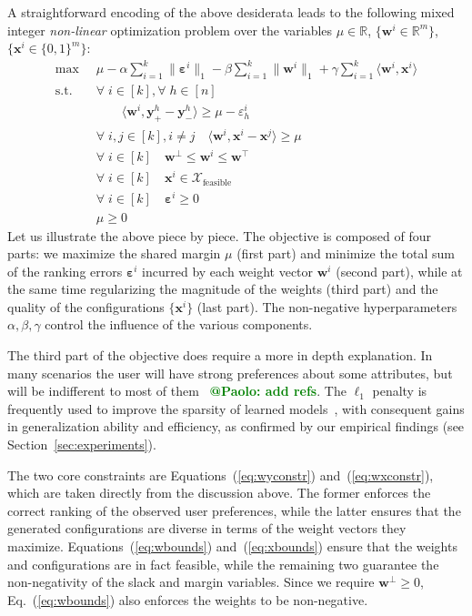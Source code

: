 \documentclass{article}
\renewcommand\[{\begin{equation}}
\renewcommand\]{\end{equation}}
\newcommand{\bbR}{\mathbb{R}}
\newcommand{\calvar}[1]{\ensuremath{\mathcal{#1}}}
\newcommand{\calX}{\calvar{X}}
\newcommand{\vecvar}[1]{\ensuremath{\boldsymbol{#1}}}
\newcommand{\vw}{\vecvar{w}}
\newcommand{\vx}{\vecvar{x}}
\newcommand{\vy}{\vecvar{y}}
\newcommand{\veps}{\vecvar{\varepsilon}}
\newcommand{\stefano}[1]{{\bf \textcolor{green}{{\fbox{Stefano:} #1}}}}
\begin{document}
A straightforward encoding of the above desiderata leads to the
following mixed integer {\em non-linear} optimization problem over the
variables $\mu \in \bbR$, $\{ \vw^i \in \bbR^m \}$, $\{ \vx^i \in \{0,1\}^m \}$:
%
{\footnotesize
\begin{align}
    \max
        & \;\; \mu - \alpha \sum_{i=1}^k \| \veps^{i} \|_1 - \beta \sum_{i=1}^k \| \vw^{i} \|_1 + \gamma \sum_{i=1}^k \langle \vw^{i}, \vx^{i} \rangle
        \nonumber
    \\
    \text{s.t.}
        & \;\; \forall \; i \in [k], \forall \; h \in [n] \nonumber
    \\
        & \;\; \qquad \langle \vw^{i}, \vy^{h}_+ - \vy^{h}_- \rangle \ge \mu - \varepsilon^{i}_h \label{eq:wyconstr}
    \\
        & \;\; \forall \; i, j \in [k], i \neq j \quad \langle \vw^{i}, \vx^{i} - \vx^{j} \rangle \ge \mu \label{eq:wxconstr}
    \\
        & \;\; \forall \; i \in [k] \quad \vw^\bot \le \vw^{i} \le \vw^\top \label{eq:wbounds}
    \\
        & \;\; \forall \; i \in [k] \quad \vx^{i} \in \calX_{\text{feasible}} \label{eq:xbounds}
    \\
        & \;\; \forall \; i \in [k] \quad \veps^{i} \ge 0 \nonumber
    \\
        & \;\; \mu \ge 0 \nonumber
\end{align}
}
%
Let us illustrate the above piece by piece. The objective is composed of four
parts: we maximize the shared margin $\mu$ (first part) and minimize the total
sum of the ranking errors $\veps^i$ incurred by each weight vector $\vw^{i}$
(second part), while at the same time regularizing the magnitude of the
weights (third part) and the quality of the configurations $\{ \vx^{i} \}$ (last
part). The non-negative hyperparameters $\alpha,\beta,\gamma$ control the
influence of the various components.

The third part of the objective does require a more in depth explanation. In
many scenarios the user will have strong preferences about some attributes, but
will be indifferent to most of them~\cite{} \stefano{@Paolo: add refs}. The $\ell_1$ penalty is frequently
used to improve the sparsity of learned models~\cite{lasso}, with consequent gains
in generalization ability and efficiency, as confirmed by our empirical
findings (see Section~\ref{sec:experiments}).

The two core constraints are Equations~(\ref{eq:wyconstr}) and~(\ref{eq:wxconstr}),
which are taken directly from the discussion above. The former enforces the
correct ranking of the observed user preferences, while the latter ensures that
the generated configurations are diverse in terms of the weight vectors they
maximize. Equations~(\ref{eq:wbounds}) and~(\ref{eq:xbounds})
ensure that the weights and configurations are in fact feasible, while the
remaining two guarantee the non-negativity of the slack and margin variables.
Since we require $\vw^\bot \ge 0$, Eq.~(\ref{eq:wbounds}) also enforces the
weights to be non-negative.
\end{document}
